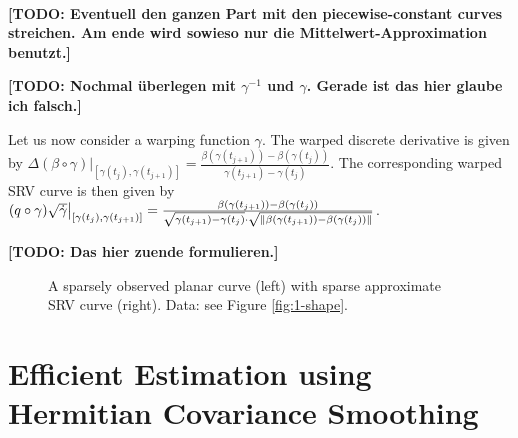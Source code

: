 \paragraph{} 
\textbf{[TODO: Eventuell den ganzen Part mit den piecewise-constant curves streichen. Am ende wird sowieso nur die Mittelwert-Approximation benutzt.]}

\textbf{[TODO: Nochmal überlegen mit $\gamma^{-1}$ und $\gamma$. Gerade ist das hier glaube ich falsch.]}

Let us now consider a warping function $\gamma$.
The warped discrete derivative is given by $\Delta (\beta \circ \gamma) \big\rvert_{[\gamma(t_j), \gamma(t_{j+1})]} = \frac{\beta(\gamma(t_{j+1})) - \beta(\gamma(t_{j}))}{\gamma(t_{j+1}) - \gamma(t_j)}$.
The corresponding warped SRV curve is then given by  $(q \circ \gamma) \sqrt{\dot\gamma} \big\rvert_{[\gamma(t_j), \gamma(t_{j+1})]} = \frac{\beta(\gamma(t_{j+1})) - \beta(\gamma(t_j))}{\sqrt{\gamma(t_{j+1}) - \gamma(t_j)} \cdot \sqrt{\lVert\beta(\gamma(t_{j+1})) - \beta(\gamma(t_j))\rVert}}$.

\textbf{[TODO: Das hier zuende formulieren.]}

\begin{figure}
  \centering
  \begin{subfigure}{.48\textwidth}
    \centering
  \end{subfigure}\hfill%
  \begin{subfigure}{.48\textwidth}
    \centering
  \end{subfigure}
  \caption{A sparsely observed planar curve (left) with sparse approximate SRV curve (right). Data: see Figure \ref{fig:1-shape}.}
  \label{fig:3-disc}
\end{figure}



\section{Efficient Estimation using Hermitian Covariance Smoothing}
\label{sec:cov}

